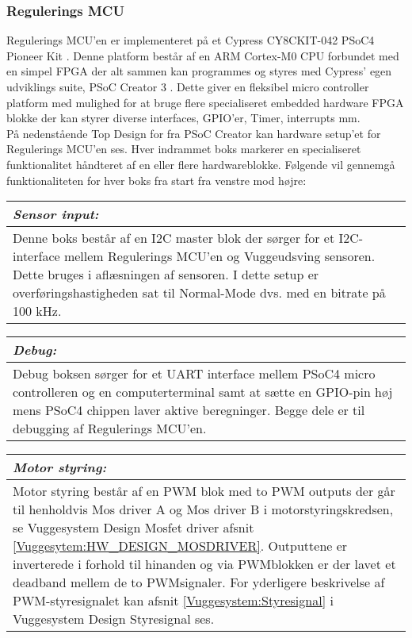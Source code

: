 \subsubsection{Regulerings MCU} \label{Vuggesystem: R_MCU} 
Regulerings MCU'en er implementeret på et Cypress CY8CKIT-042 PSoC4 Pioneer Kit \citep{website:Cypress}. Denne platform består af en ARM Cortex-M0 CPU forbundet med en simpel FPGA der alt sammen kan programmes og styres med Cypress' egen udviklings suite, PSoC Creator 3 \citep{website:PSoC_Creator}. Dette giver en fleksibel micro controller platform med mulighed for at bruge flere specialiseret embedded hardware FPGA blokke der kan styrer diverse interfaces, GPIO'er, Timer, interrupts mm. \\
På nedenstående Top Design for fra PSoC Creator kan hardware setup'et for Regulerings MCU'en ses. Hver indrammet boks markerer en specialiseret funktionalitet håndteret af en eller flere hardwareblokke.
Følgende vil gennemgå funktionaliteten for hver boks fra start fra venstre mod højre:
\begin{center}
    \begin{tabular}{| p{14.5cm} |}
    \hline
    \textit{Sensor input:} \\ \hline
    Denne boks består af en I2C master blok der sørger for et I2C-interface mellem Regulerings MCU'en og Vuggeudsving sensoren. Dette bruges i aflæsningen af sensoren. I dette setup er overføringshastigheden sat til Normal-Mode dvs. med en bitrate på 100 kHz. \\ \hline
    \end{tabular}
\end{center}

\begin{center}
    \begin{tabular}{| p{14.5cm} |}
    \hline
    \textit{Debug:} \\ \hline
    Debug boksen sørger for et UART interface mellem PSoC4 micro controlleren og en computerterminal samt at sætte en GPIO-pin høj mens PSoC4 chippen laver aktive beregninger. Begge dele er til debugging af Regulerings MCU'en. \\ \hline
    \end{tabular}
\end{center}

\begin{center}
    \begin{tabular}{| p{14.5cm} |}
    \hline
    \textit{Motor styring:} \\ \hline
    Motor styring består af en PWM blok med to PWM outputs der går til henholdvis Mos driver A og Mos driver B i motorstyringskredsen, se Vuggesystem Design Mosfet driver afsnit \vref{Vuggesytem:HW_DESIGN_MOSDRIVER}. Outputtene er inverterede i forhold til hinanden og via PWMblokken er der lavet et deadband mellem de to PWMsignaler. For yderligere beskrivelse af PWM-styresignalet kan afsnit \vref{Vuggesystem:Styresignal} i Vuggesystem Design Styresignal ses. \\ \hline
    \end{tabular}
\end{center}



